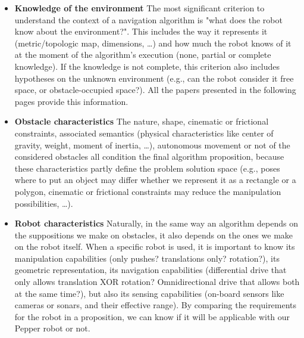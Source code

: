 \begin{itemize}
  \item \textbf{Knowledge of the environment} The most significant criterion to understand the context of a navigation algorithm is "what does the robot know about the environment?". This includes the way it represents it (metric/topologic map, dimensions, \dots) and how much the robot knows of it at the moment of the algorithm's execution (none, partial or complete knowledge). If the knowledge is not complete, this criterion also includes hypotheses on the unknown environment (e.g., can the robot consider it free space, or obstacle-occupied space?). All the papers presented in the following pages provide this information.
  \item \textbf{Obstacle characteristics} The nature, shape, cinematic or frictional constraints, associated semantics (physical characteristics like center of gravity, weight, moment of inertia, \dots), autonomous movement or not of the considered obstacles all condition the final algorithm proposition, because these characteristics partly define the problem solution space (e.g., poses where to put an object may differ whether we represent it as a rectangle or a polygon, cinematic or frictional constraints may reduce the manipulation possibilities, \dots).
  \item \textbf{Robot characteristics} Naturally, in the same way an algorithm depends on the suppositions we make on obstacles, it also depends on the ones we make on the robot itself. When a specific robot is used, it is important to know its manipulation capabilities (only pushes? translations only? rotation?), its geometric representation, its navigation capabilities (differential drive that only allows translation XOR rotation? Omnidirectional drive that allows both at the same time?), but also its sensing capabilities (on-board sensors like cameras or sonars, and their effective range). By comparing the requirements for the robot in a proposition, we can know if it will be applicable with our Pepper robot or not.

\end{itemize}
